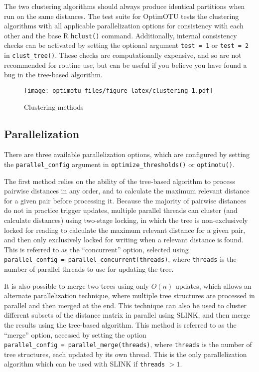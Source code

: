 \documentclass[
]{article}
\begin{document}
The two clustering algorithms should always produce identical partitions when run on the same distances.
The test suite for OptimOTU tests the clustering algorithms with all applicable parallelization options for consistency with each other and the base R \texttt{hclust()} command.
Additionally, internal consistency checks can be activated by setting the optional argument \texttt{test\ =\ 1} or \texttt{test\ =\ 2} in \texttt{clust\_tree()}.
These checks are computationally expensive, and so are not recommended for routine use, but can be useful if you believe you have found a bug in the tree-based algorithm.

\begin{figure}
\centering
\texttt{[image: optimotu\_files/figure-latex/clustering-1.pdf]}
\caption{\label{fig:clustering}Clustering methods}
\end{figure}

\subsection{Parallelization}\label{parallelization}

There are three available parallelization options, which are configured by setting the \texttt{parallel\_config} argument in \texttt{optimize\_thresholds()} or \texttt{optimotu()}.

The first method relies on the ability of the tree-based algorithm to process pairwise distances in any order, and to calculate the maximum relevant distance for a given pair before processing it.
Because the majority of pairwise distances do not in practice trigger updates, multiple parallel threads can cluster (and calculate distances) using two-stage locking, in which the tree is non-exclusively locked for reading to calculate the maximum relevant distance for a given pair, and then only exclusively locked for writing when a relevant distance is found.
This is referred to as the ``concurrent'' option, selected using \texttt{parallel\_config\ =\ parallel\_concurrent(threads)}, where \texttt{threads} is the number of parallel threads to use for updating the tree.

It is also possible to merge two trees using only \(O(n)\) updates, which allows an alternate parallelization technique, where multiple tree structures are processed in parallel and then merged at the end.
This technique can also be used to cluster different subsets of the distance matrix in parallel using SLINK, and then merge the results using the tree-based algorithm.
This method is referred to as the ``merge'' option, accessed by setting the option \texttt{parallel\_config\ =\ parallel\_merge(threads)}, where \texttt{threads} is the number of tree structures, each updated by its own thread.
This is the only parallelization algorithm which can be used with SLINK if \texttt{threads} \(> 1\).
\end{document}
